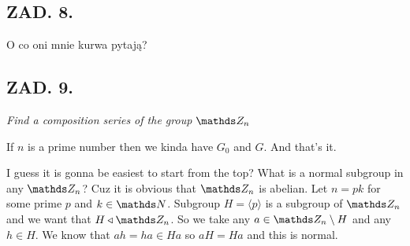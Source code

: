 \documentclass{article}[13pt]
\begin{document}
\subsection*{ZAD. 8.}

O co oni mnie kurwa pytają?

\subsection*{ZAD. 9.}

\emph{Find a composition series of the group $\Z_n$}
\medskip

If $n$ is a prime number then we kinda have $G_0$ and $G$. And that's it.
\medskip

I guess it is gonna be easiest to start from the top? What is a normal subgroup in any $\Z_n$? Cuz it is obvious that $\Z_n$ is abelian. Let $n=pk$ for some prime $p$ and $k\in\N$. Subgroup $H=\langle p\rangle$ is a subgroup of $\Z_n$ and we want that $H\dzielnat \Z_n$. So we take any $a\in \Z_n\setminus H$ and any $h\in H$. We know that $ah=ha\in Ha$ so $aH=Ha$ and this is normal.
\end{document}
